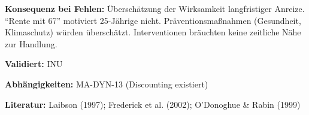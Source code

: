\textbf{Konsequenz bei Fehlen:}
Überschätzung der Wirksamkeit langfristiger Anreize. ``Rente mit 67'' motiviert 25-Jährige nicht. Präventionsmaßnahmen (Gesundheit, Klimaschutz) würden überschätzt. Interventionen bräuchten keine zeitliche Nähe zur Handlung.

\textbf{Validiert:} INU

\textbf{Abhängigkeiten:} MA-DYN-13 (Discounting existiert)

\textbf{Literatur:} Laibson (1997); Frederick et al. (2002); O'Donoghue \& Rabin (1999)

